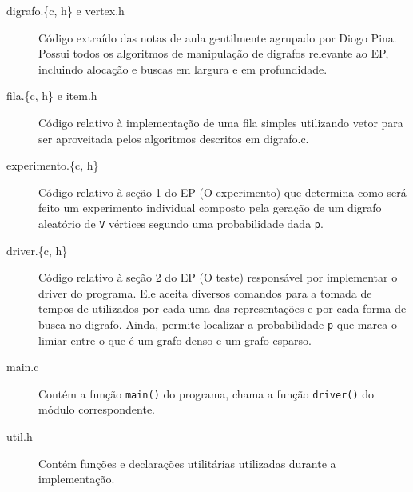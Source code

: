 \documentclass[brazil,times]{abnt}
\begin{document}
\begin{description}
	\item[digrafo.\{c, h\} e vertex.h] Código extraído das notas de aula gentilmente agrupado por Diogo Pina. Possui todos os algoritmos de manipulação de digrafos relevante ao EP, incluindo alocação e buscas em largura e em profundidade.
	\item[fila.\{c, h\} e item.h] Código relativo à implementação de uma fila simples utilizando vetor para ser aproveitada pelos algoritmos descritos em digrafo.c.
	\item[experimento.\{c, h\}] Código relativo à seção 1 do EP (O experimento) que determina como será feito um experimento individual composto pela geração de um digrafo aleatório de \texttt{V} vértices segundo uma probabilidade dada \texttt{p}.
	\item[driver.\{c, h\}] Código relativo à seção 2 do EP (O teste) responsável por implementar o driver do programa. Ele aceita diversos comandos para a tomada de tempos de utilizados por cada uma das representações e por cada forma de busca no digrafo. Ainda, permite localizar a probabilidade \texttt{p} que marca o limiar entre o que é um grafo denso e um grafo esparso.
	\item[main.c] Contém a função \texttt{main()} do programa, chama a função \texttt{driver()} do módulo correspondente.
	\item[util.h] Contém funções e declarações utilitárias utilizadas durante a implementação.
\end{description}
\end{document}
